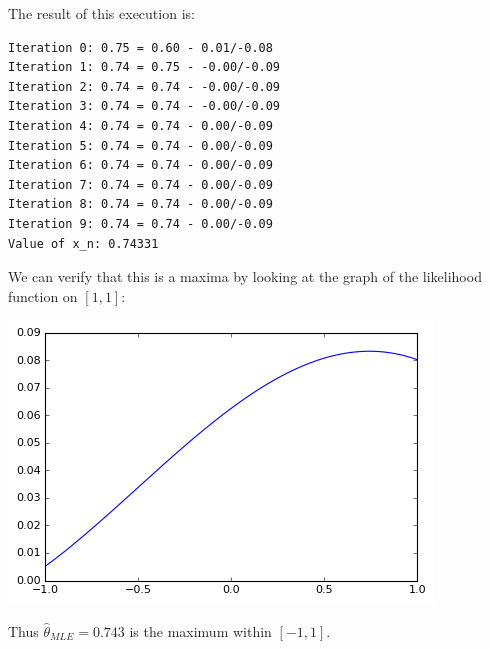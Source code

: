 \documentclass{article}
\begin{document}
The result of this execution is:
\begin{verbatim}
Iteration 0: 0.75 = 0.60 - 0.01/-0.08
Iteration 1: 0.74 = 0.75 - -0.00/-0.09
Iteration 2: 0.74 = 0.74 - -0.00/-0.09
Iteration 3: 0.74 = 0.74 - -0.00/-0.09
Iteration 4: 0.74 = 0.74 - 0.00/-0.09
Iteration 5: 0.74 = 0.74 - 0.00/-0.09
Iteration 6: 0.74 = 0.74 - 0.00/-0.09
Iteration 7: 0.74 = 0.74 - 0.00/-0.09
Iteration 8: 0.74 = 0.74 - 0.00/-0.09
Iteration 9: 0.74 = 0.74 - 0.00/-0.09
Value of x_n: 0.74331
\end{verbatim}
We can verify that this is a maxima by looking at the graph of the likelihood function on $[1,1]$:

\begin{center}\includegraphics[scale=0.8]{hw3_4_graph}\end{center}

Thus $\hat{\theta}_{MLE}=0.743$ is the maximum within $[-1,1]$. 
\end{document}
